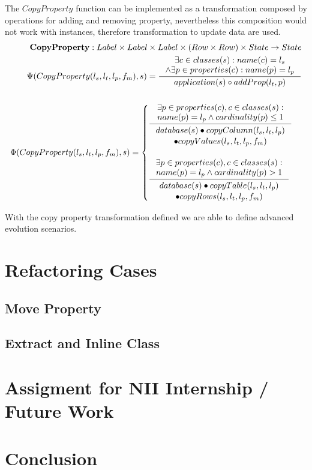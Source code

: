 \documentclass[11pt]{article}
\begin{document}
The $CopyProperty$ function can be implemented as a transformation composed by operations for adding and removing property, nevertheless this composition would not work with instances, therefore transformation to update data are used.
\begin{align*}
	\mathbf{CopyProperty} : Label \times Label \times Label \times (Row \times Row) \times State \rightarrow State \\
	\Psi(CopyProperty(l_s, l_t, l_p, f_m), s) = \inference{\exists c \in classes(s) : name(c) = l_s \\ \wedge \exists p \in properties(c) : name(p) = l_p }{application(s) \circ addProp(l_t, p)} \\\\
	\Phi(CopyProperty(l_s, l_t, l_p, f_m), s) = \begin{cases}
		\inference{\exists p \in properties(c), c \in classes(s) : \\ name(p) = l_p \wedge cardinality(p) \leq 1 }{\begin{gathered}
			database(s) \bullet copyColumn(l_s, l_t, l_p) \\ \bullet copyValues(l_s, l_t, l_p, f_m) 
			\end{gathered}} \\ \\
		\inference{\exists p \in properties(c), c \in classes(s) : \\ name(p) = l_p \wedge cardinality(p) > 1}{\begin{gathered}
			database(s) \bullet copyTable(l_s, l_t, l_p) \\ \bullet copyRows(l_s, l_t, l_p, f_m) 
			\end{gathered}}
 \end{cases}
\end{align*}

With the copy property transformation defined we are able to define advanced evolution scenarios.


\section{Refactoring Cases}
\subsection{Move Property}
\subsection{Extract and Inline Class}

\section{Assigment for NII Internship / Future Work}
\section{Conclusion}
\end{document}
